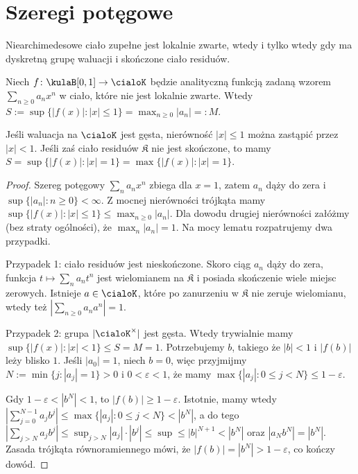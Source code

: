\section{Szeregi potęgowe}
\begin{lemat}
	Niearchimedesowe ciało zupełne jest lokalnie zwarte, wtedy i tylko wtedy gdy ma dyskretną grupę waluacji i skończone ciało residuów.
\end{lemat}

\begin{lemat}
	Niech $f \colon \kulaB[0,1] \to \cialoK$ będzie analityczną funkcją zadaną wzorem $\sum_{n \ge 0} a_nx^n$ w ciało, które nie jest lokalnie zwarte.
	Wtedy $S := \sup \{|f(x)| : |x| \le 1\} = \max_{n \ge 0} |a_n| =: M$.

	Jeśli waluacja na $\cialoK$ jest gęsta, nierówność $|x| \le 1$ można zastąpić przez $|x| < 1$.
	Jeśli zaś ciało residuów $\mathfrak K$ nie jest skończone, to mamy
	$S = \sup\{|f(x)| : |x| = 1\} = \max\{|f(x)| : |x| = 1\}$.
\end{lemat}

\begin{proof}
	Szereg potęgowy $\sum_n a_n x^n$ zbiega dla $x = 1$, zatem $a_n$ dąży do zera i $\sup\{|a_n| : n \ge 0\} < \infty$.
	Z mocnej nierówności trójkąta mamy $\sup\{|f(x)| : |x| \le 1\} \le \max_{n \ge 0} |a_n|$.
	Dla dowodu drugiej nierówności załóżmy (bez straty ogólności), że $\max_n |a_n| = 1$.
	Na mocy lematu rozpatrujemy dwa przypadki.

	Przypadek 1: ciało residuów jest nieskończone.
	Skoro ciąg $a_n$ dąży do zera, funkcja $t \mapsto \sum_n a_nt^n$ jest wielomianem na $\mathfrak K$ i posiada skończenie wiele miejsc zerowych.
	Istnieje $a \in \cialoK$, które po zanurzeniu w $\mathfrak K$ nie zeruje wielomianu, wtedy też $|\sum_{n \ge 0} a_na^n| = 1$.

	Przypadek 2: grupa $|\cialoK^\times|$ jest gęsta. Wtedy trywialnie mamy $ \sup\{|f(x)| : |x| < 1\} \le S = M = 1$.
	Potrzebujemy $b$, takiego że $|b| < 1$ i $|f(b)|$ leży blisko $1$.
	Jeśli $|a_0| = 1$, niech $b = 0$, więc przyjmijmy $N := \min\{j : |a_j| = 1\} > 0$ i $0 < \varepsilon < 1$, że mamy $\max \{|a_j| : 0 \le j < N\} \le 1 - \varepsilon$.
	
	Gdy $1 - \varepsilon < |b^N| < 1$, to $|f(b)| \ge 1 - \varepsilon$.
	Istotnie, mamy wtedy $|\sum_{j=0}^{N-1} a_jb^j| \le \max \{|a_j| : 0 \le j < N\} < |b^N|$, a do tego $|\sum_{j > N} a_jb^j| \le \sup_{j > N} |a_j| \cdot |b^j| \le \sup \le |b|^{N+1} < |b^N|$ oraz $|a_Nb^N| = |b^N|$.
	Zasada trójkąta równoramiennego mówi, że $|f(b)| = |b^N| > 1 - \varepsilon$, co kończy dowód.
\end{proof}

